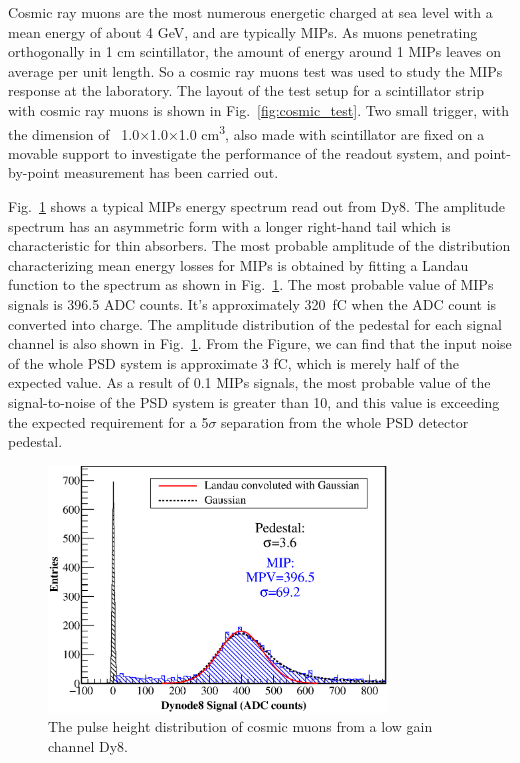 \documentclass[5p, times]{elsarticle}
\begin{document}
Cosmic ray muons are the most numerous energetic charged at sea level with a mean energy of about 4 GeV, and are typically MIPs. 
As muons penetrating orthogonally in 1 cm scintillator, the amount of energy around 1 MIPs leaves on average per unit length. 
So a cosmic ray muons test was used to study the MIPs response at the laboratory. 
The layout of the test setup for a scintillator strip with cosmic ray muons is shown in Fig.~\ref{fig:cosmic_test}. 
Two small trigger, with the dimension of \ 1.0×1.0×1.0 cm\textsuperscript{3}, also made with scintillator are fixed on a movable support to investigate the performance of the readout system, and point-by-point measurement has been carried out. 

Fig.~\ref{fig:mip} shows a typical MIPs energy spectrum read out from Dy8. 
The amplitude spectrum has an asymmetric form with a longer right-hand tail which is characteristic for thin absorbers. 
The most probable amplitude of the distribution characterizing mean energy losses for MIPs is obtained by fitting a Landau function to the spectrum as shown in Fig.~\ref{fig:mip}. 
The most probable value of MIPs signals is 396.5 ADC counts. 
It’s approximately \SI{320}{\femto\coulomb} when the ADC count is converted into charge. 
The amplitude distribution of the pedestal for each signal channel is also shown in Fig.~\ref{fig:mip}.
From the Figure, we can find that the input noise of the whole PSD system is approximate 3 fC, which is merely half of the expected value. 
As a result of 0.1 MIPs signals, the most probable value of the signal-to-noise of the PSD system is greater than 10, and this value is exceeding the expected requirement for a 5$\sigma $ separation from the whole PSD detector pedestal.

\begin{figure}
 \centering
 \includegraphics[width=90mm]{mip}
\caption{The pulse height distribution of cosmic muons from a low gain channel Dy8.}
\label{fig:mip}
\end{figure} 
\end{document}
